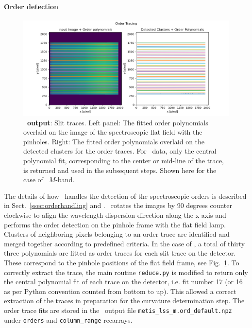\paragraph{Order detection}\label{sec:critalg_orderdet}

\begin{figure}[!h]
  \centering
  \includegraphics[width=\textwidth]{figures/LSS_CrtAlg_files/Figure_4.png}
  \caption{\textbf{\pyred~output}: Slit traces. Left panel: The fitted order polynomials overlaid on the image of the spectroscopic flat field with the pinholes. Right: The fitted order polynomials overlaid on the detected clusters for the order traces. For \met~data, only the central polynomial fit, corresponding to the center or mid-line of the trace, is returned and used in the subsequent steps. Shown here for the case of \lss~$M$-band. }
  \label{fig:fig3}
\end{figure}

The details of how \pyred~handles the detection of the spectroscopic orders is described in Sect.~\ref{ssec:orderhandling} and \cite{pis02, pis21}. 
\pyred~rotates the images by 90 degrees counter clockwise to align the wavelength dispersion direction along the x-axis and performs the order detection on the pinhole frame with the flat field lamp.  Clusters of neighboring pixels belonging to an order trace are identified  and merged together according to predefined criteria. In the case of \met, a total of thirty three polynomials are fitted as order traces for each slit trace on the detector. These correspond to the pinhole positions of the flat field frame, see Fig.~\ref{fig:fig3}. To correctly extract the trace, the main routine \texttt{reduce.py} is modified to return only the central polynomial fit of each trace on the detector, i.e. fit number 17 (or 16 as per Python convention counted from bottom to up). This allowed a correct extraction of the traces in preparation for the curvature determination step. The order trace fits are stored in the \pyred~output file \texttt{metis\_lss\_m.ord\_default.npz} under \texttt{orders} and \texttt{column\_range} recarrays.
